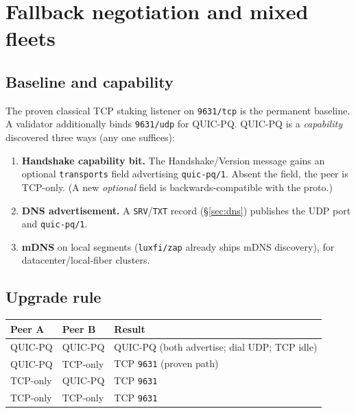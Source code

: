 \documentclass[11pt,a4paper]{article}
\newcommand{\msg}[1]{\textsf{#1}}
\newcommand{\code}[1]{\texttt{#1}}
\begin{document}
\section{Fallback negotiation and mixed fleets}\label{sec:fallback}

\subsection{Baseline and capability}

The proven classical TCP staking listener on \code{9631/tcp} is the
permanent baseline. A validator additionally binds \code{9631/udp} for
QUIC-PQ. QUIC-PQ is a \emph{capability} discovered three ways
(any one suffices):

\begin{enumerate}[nosep]
  \item \textbf{Handshake capability bit.} The \msg{Handshake}/\msg{Version}
        message gains an optional \code{transports} field advertising
        \code{quic-pq/1}. Absent the field, the peer is TCP-only. (A new
        \emph{optional} field is backwards-compatible with the proto.)
  \item \textbf{DNS advertisement.} A \code{SRV}/\code{TXT} record
        (\S\ref{sec:dns}) publishes the UDP port and \code{quic-pq/1}.
  \item \textbf{mDNS} on local segments (\code{luxfi/zap} already ships
        mDNS discovery), for datacenter/local-fiber clusters.
\end{enumerate}

\subsection{Upgrade rule}

\begin{center}\small
\begin{tabular}{@{}lll@{}}
\toprule
\textbf{Peer A} & \textbf{Peer B} & \textbf{Result} \\
\midrule
QUIC-PQ & QUIC-PQ & QUIC-PQ (both advertise; dial UDP; TCP idle) \\
QUIC-PQ & TCP-only & TCP \code{9631} (proven path) \\
TCP-only & QUIC-PQ & TCP \code{9631} \\
TCP-only & TCP-only & TCP \code{9631} \\
\bottomrule
\end{tabular}
\end{center}
\end{document}
